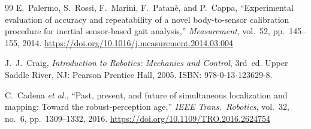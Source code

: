 \documentclass[11pt,a4paper]{article}
\begin{document}
\begin{thebibliography}{99}
E.~Palermo, S.~Rossi, F.~Marini, F.~Patanè, and P.~Cappa,
``Experimental evaluation of accuracy and repeatability of a novel
body-to-sensor calibration procedure for inertial sensor-based gait
analysis,'' \textit{Measurement}, vol.~52, pp.~145--155, 2014.
\url{https://doi.org/10.1016/j.measurement.2014.03.004}

J.~J.~Craig, \textit{Introduction to Robotics: Mechanics and Control},
3rd~ed. Upper Saddle River, NJ: Pearson Prentice Hall, 2005.
ISBN: 978-0-13-123629-8.

C.~Cadena \textit{et al.}, ``Past, present, and future of simultaneous
localization and mapping: Toward the robust-perception age,''
\textit{IEEE Trans.~Robotics}, vol.~32, no.~6, pp.~1309--1332, 2016.
\url{https://doi.org/10.1109/TRO.2016.2624754}

\end{thebibliography}
\end{document}
